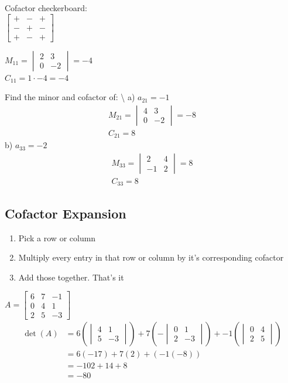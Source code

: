 \documentclass[
  letterpaper,
  DIV=11,
  numbers=noendperiod]{scrartcl}
\providecommand{\tightlist}{%
  \setlength{\itemsep}{0pt}\setlength{\parskip}{0pt}}\usepackage{longtable,booktabs,array}
\begin{document}
Cofactor checkerboard:\\
\(\begin{bmatrix}+ & - & + \\ - & + & - \\ + & - & +\end{bmatrix}\)

\(M_{11} = \begin{vmatrix}2 & 3 \\ 0 & -2\end{vmatrix} = -4\)\\
\(C_{11} = 1 \cdot -4 = -4\)

Find the minor and cofactor of: \textbackslash{} a) \(a_{21} = -1\)
\begin{align*}
M_{21} = \begin{vmatrix}4 & 3 \\ 0 & -2 \end{vmatrix} = -8 \\
C_{21} = 8
\end{align*} b) \(a_{33} = -2\) \begin{align*}
M_{33} = \begin{vmatrix}2 & 4 \\ -1 & 2 \end{vmatrix} = 8 \\
C_{33} = 8
\end{align*}

\hypertarget{cofactor-expansion}{%
\subsection{Cofactor Expansion}\label{cofactor-expansion}}

\begin{enumerate}
\def\labelenumi{\arabic{enumi})}
\tightlist
\item
  Pick a row or column
\item
  Multiply every entry in that row or column by it's corresponding
  cofactor
\item
  Add those together. That's it
\end{enumerate}

\(A = \begin{bmatrix} 6 & 7 & -1 \\ 0 & 4 & 1 \\ 2 & 5 & -3\end{bmatrix}\)
\begin{align*}
\det(A) &= 6\left(\begin{vmatrix}4 & 1 \\ 5 & -3\end{vmatrix}\right) + 7\left(-\begin{vmatrix}0 & 1 \\ 2 & -3\end{vmatrix}\right) + -1\left(\begin{vmatrix}0 & 4 \\ 2 & 5 \end{vmatrix}\right) \\
&=6(-17) + 7(2) + (-1(-8)) \\
&= -102+14+8 \\
&=-80
\end{align*}
\end{document}
